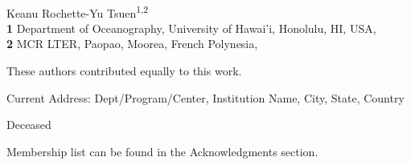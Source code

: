 \documentclass[
  10pt,
  letterpaper,
]{article}
\begin{document}
\vspace*{0.2in}

\begin{flushleft}
{\Large
\textbf{} %
}
\newline
\\
Keanu Rochette-Yu Tsuen\textsuperscript{1,2\Yinyang}
\\
\bigskip
\textbf{1} Department of Oceanography, University of
Hawai'i, Honolulu, HI, USA, \\ \textbf{2} MCR
LTER, Paopao, Moorea, French Polynesia, 
\bigskip

% 
%
\Yinyang These authors contributed equally to this work.


\textcurrency Current Address: Dept/Program/Center, Institution Name, City, State, Country %

\dag Deceased

\textpilcrow Membership list can be found in the Acknowledgments section.


\end{flushleft}
\end{document}
